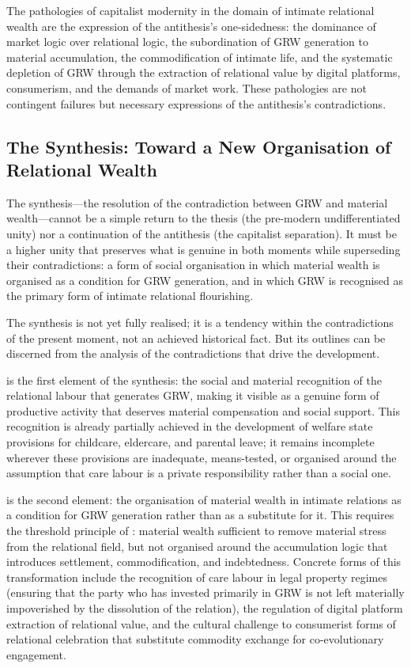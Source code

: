 The pathologies of capitalist modernity in the domain of intimate relational wealth are the expression of the antithesis's one-sidedness: the dominance of market logic over relational logic, the subordination of GRW generation to material accumulation, the commodification of intimate life, and the systematic depletion of GRW through the extraction of relational value by digital platforms, consumerism, and the demands of market work. These pathologies are not contingent failures but necessary expressions of the antithesis's contradictions.

\subsection{The Synthesis: Toward a New Organisation of Relational Wealth}
\label{p15:subsec:synthesis}

\noindent
The synthesis---the resolution of the contradiction between GRW and material wealth---cannot be a simple return to the thesis (the pre-modern undifferentiated unity) nor a continuation of the antithesis (the capitalist separation). It must be a higher unity that preserves what is genuine in both moments while superseding their contradictions: a form of social organisation in which material wealth is organised as a condition for GRW generation, and in which GRW is recognised as the primary form of intimate relational flourishing.

The synthesis is not yet fully realised; it is a tendency within the contradictions of the present moment, not an achieved historical fact. But its outlines can be discerned from the analysis of the contradictions that drive the development.

 is the first element of the synthesis: the social and material recognition of the relational labour that generates GRW, making it visible as a genuine form of productive activity that deserves material compensation and social support. This recognition is already partially achieved in the development of welfare state provisions for childcare, eldercare, and parental leave; it remains incomplete wherever these provisions are inadequate, means-tested, or organised around the assumption that care labour is a private responsibility rather than a social one.

 is the second element: the organisation of material wealth in intimate relations as a condition for GRW generation rather than as a substitute for it. This requires the threshold principle of : material wealth sufficient to remove material stress from the relational field, but not organised around the accumulation logic that introduces settlement, commodification, and indebtedness. Concrete forms of this transformation include the recognition of care labour in legal property regimes (ensuring that the party who has invested primarily in GRW is not left materially impoverished by the dissolution of the relation), the regulation of digital platform extraction of relational value, and the cultural challenge to consumerist forms of relational celebration that substitute commodity exchange for co-evolutionary engagement.


